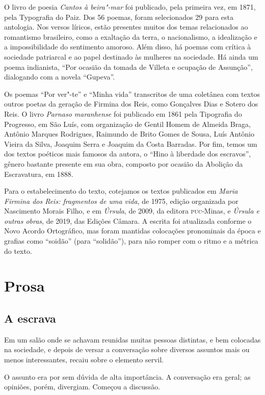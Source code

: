O livro de poesia \emph{Cantos à beira"-mar} foi publicado, pela primeira
vez, em 1871, pela Typografia do Paiz. Dos 56 poemas, foram selecionados
29 para esta antologia. Nos versos líricos, estão presentes muitos dos
temas relacionados ao romantismo brasileiro, como a exaltação da terra,
o nacionalismo, a idealização e a impossibilidade do sentimento amoroso.
Além disso, há poemas com crítica à sociedade patriarcal e ao papel
destinado às mulheres na sociedade. Há ainda um poema indianista, ``Por
ocasião da tomada de Villeta e ocupação de Assunção'', dialogando com a
novela ``Gupeva''.

Os poemas ``Por ver"-te'' e ``Minha vida'' transcritos de uma coletânea
com textos outros poetas da geração de Firmina dos Reis, como Gonçalves
Dias e Sotero dos Reis. O livro \emph{Parnaso maranhense} foi publicado
em 1861 pela Tipografia do Progresso, em São Luís, com organização de
Gentil Homem de Almeida Braga, Antônio Marques Rodrigues, Raimundo de
Brito Gomes de Sousa, Luís Antônio Vieira da Silva, Joaquim Serra e
Joaquim da Costa Barradas. Por fim, temos um dos textos poéticos mais
famosos da autora, o ``Hino à liberdade dos escravos'', gênero bastante
presente em sua obra, composto por ocasião da Abolição da Escravatura,
em 1888.

Para o estabelecimento do texto, cotejamos os textos publicados em
\emph{Maria Firmina dos Reis: fragmentos de uma vida}, de 1975, edição
organizada por Nascimento Morais Filho, e em \emph{Úrsula}, de 2009, da
editora \textsc{puc}-Minas, e \emph{Úrsula e outras obras}, de 2019, das Edições
Câmara. A escrita foi atualizada conforme o Novo Acordo Ortográfico, mas
foram mantidas colocações pronominais da época e grafias como ``soidão''
(para ``solidão''), para não romper com o ritmo e a métrica do texto.

\part{Prosa}

\chapter{A escrava}

Em um salão onde se achavam reunidas muitas pessoas distintas, e bem
colocadas na sociedade, e depois de versar a conversação sobre diversos
assuntos mais ou menos interessantes, recaiu sobre o elemento servil.

O assunto era por sem dúvida de alta importância. A conversação era
geral; as opiniões, porém, divergiam. Começou a discussão.

